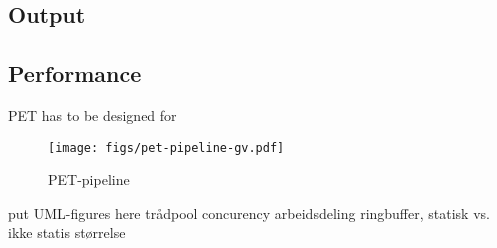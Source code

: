 
\subsection{Output}

\subsection{Performance}

PET has to be designed for 

\begin{figure}
    \texttt{[image: figs/pet-pipeline-gv.pdf]}
    \caption{PET-pipeline}
    \label{fig:pipeline}
\end{figure}

put UML-figures here
trådpool
concurency
arbeidsdeling
ringbuffer, statisk vs. ikke statis størrelse


